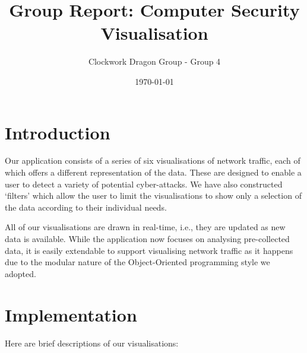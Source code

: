 \documentclass[12pt,a4paper]{article}
\author{Clockwork Dragon Group - Group 4}
\title{Group Report: Computer Security Visualisation}
\date{\today}
\begin{document}
	
	\maketitle

    \section*{Introduction}
	Our application consists of a series of six visualisations of network traffic, each of which offers a different representation of the data. These are designed to enable a user to detect a variety of potential cyber-attacks. 
			We have also constructed `filters' which allow the user to limit the visualisations to show only a selection of the data according to their individual needs. 
			
			All of our visualisations are drawn in real-time, i.e., they are updated as new data is available. While the application now focuses on analysing pre-collected data, it is easily extendable to support visualising network traffic as it happens due to the modular nature of the Object-Oriented programming style we adopted.

    \section*{Implementation}
			Here are brief descriptions of our visualisations:
			
\end{document}
